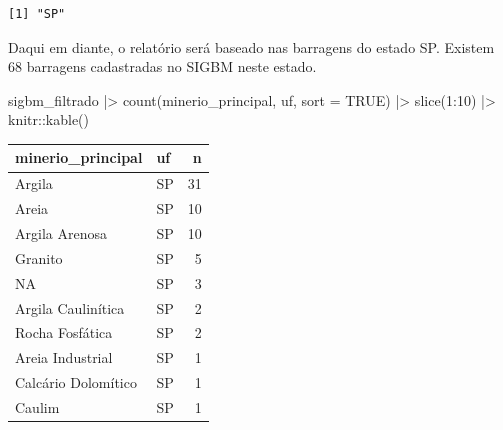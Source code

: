 \documentclass[
  letterpaper,
  DIV=11,
  numbers=noendperiod]{scrartcl}
\newenvironment{Shaded}{\begin{snugshade}}{\end{snugshade}}
\newcommand{\AttributeTok}[1]{\textcolor[rgb]{0.40,0.45,0.13}{#1}}
\newcommand{\ConstantTok}[1]{\textcolor[rgb]{0.56,0.35,0.01}{#1}}
\newcommand{\DecValTok}[1]{\textcolor[rgb]{0.68,0.00,0.00}{#1}}
\newcommand{\FunctionTok}[1]{\textcolor[rgb]{0.28,0.35,0.67}{#1}}
\newcommand{\NormalTok}[1]{\textcolor[rgb]{0.00,0.23,0.31}{#1}}
\newcommand{\OtherTok}[1]{\textcolor[rgb]{0.00,0.23,0.31}{#1}}
\newcommand{\SpecialCharTok}[1]{\textcolor[rgb]{0.37,0.37,0.37}{#1}}
\begin{document}
\begin{verbatim}
[1] "SP"
\end{verbatim}

\begin{Shaded}
\end{Shaded}

Daqui em diante, o relatório será baseado nas barragens do estado SP.
Existem 68 barragens cadastradas no SIGBM neste estado.

\begin{Shaded}
\begin{Highlighting}[]
\NormalTok{sigbm\_filtrado }\SpecialCharTok{|\textgreater{}} 
  \FunctionTok{count}\NormalTok{(minerio\_principal, uf, }\AttributeTok{sort =} \ConstantTok{TRUE}\NormalTok{) }\SpecialCharTok{|\textgreater{}} 
  \FunctionTok{slice}\NormalTok{(}\DecValTok{1}\SpecialCharTok{:}\DecValTok{10}\NormalTok{) }\SpecialCharTok{|\textgreater{}} 
\NormalTok{  knitr}\SpecialCharTok{::}\FunctionTok{kable}\NormalTok{()}
\end{Highlighting}
\end{Shaded}

\begin{longtable}[]{@{}llr@{}}
\toprule()
minerio\_principal & uf & n \\
\midrule()
\endhead
Argila & SP & 31 \\
Areia & SP & 10 \\
Argila Arenosa & SP & 10 \\
Granito & SP & 5 \\
NA & SP & 3 \\
Argila Caulinítica & SP & 2 \\
Rocha Fosfática & SP & 2 \\
Areia Industrial & SP & 1 \\
Calcário Dolomítico & SP & 1 \\
Caulim & SP & 1 \\
\bottomrule()
\end{longtable}
\end{document}
